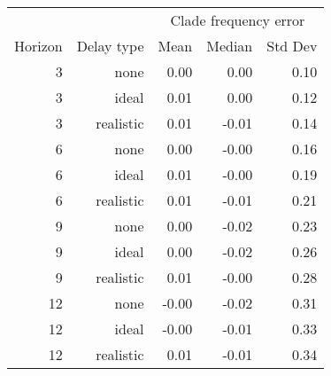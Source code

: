 
\begin{tabular*}{0.7\textwidth}{rrrrr}
\toprule
        &            & \multicolumn{3}{c}{Clade frequency error} \\
Horizon & Delay type & Mean & Median & Std Dev \\
\midrule

3 & none & 0.00 & 0.00 & 0.10 \\
3 & ideal & 0.01 & 0.00 & 0.12 \\
3 & realistic & 0.01 & -0.01 & 0.14 \\
6 & none & 0.00 & -0.00 & 0.16 \\
6 & ideal & 0.01 & -0.00 & 0.19 \\
6 & realistic & 0.01 & -0.01 & 0.21 \\
9 & none & 0.00 & -0.02 & 0.23 \\
9 & ideal & 0.00 & -0.02 & 0.26 \\
9 & realistic & 0.01 & -0.00 & 0.28 \\
12 & none & -0.00 & -0.02 & 0.31 \\
12 & ideal & -0.00 & -0.01 & 0.33 \\
12 & realistic & 0.01 & -0.01 & 0.34 \\

\bottomrule
\end{tabular*}

